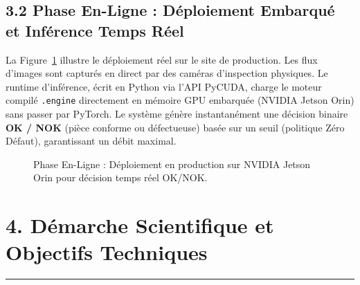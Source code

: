 \documentclass[11pt,a4paper]{article}
\begin{document}
\subsection*{\color{darkBlue} 3.2 Phase En-Ligne : Déploiement Embarqué et Inférence Temps Réel}

La Figure~\ref{fig:pipeline_online} illustre le déploiement réel sur le site de production. Les flux d'images sont capturés en direct par des caméras d'inspection physiques. Le runtime d'inférence, écrit en Python via l'API PyCUDA, charge le moteur compilé \texttt{.engine} directement en mémoire GPU embarquée (NVIDIA Jetson Orin) sans passer par PyTorch. Le système génère instantanément une décision binaire \textbf{OK / NOK} (pièce conforme ou défectueuse) basée sur un seuil (politique Zéro Défaut), garantissant un débit maximal.

\begin{figure}[h!]
\centering
{}
\caption{Phase En-Ligne : Déploiement en production sur NVIDIA Jetson Orin pour décision temps réel OK/NOK.}
\label{fig:pipeline_online}
\end{figure}

\section*{\color{darkBlue} 4. Démarche Scientifique et Objectifs Techniques}
\hrule
\vspace{0.2cm}
\end{document}

